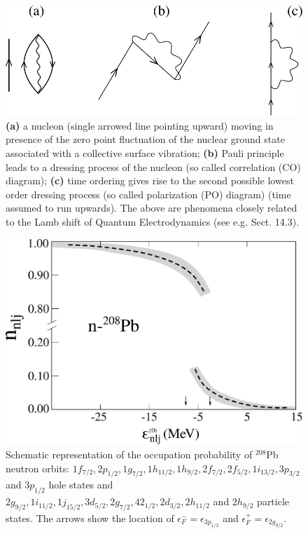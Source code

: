 \begin{figure}
	\centerline {
		\includegraphics*[width=12cm]{introduccion/figs/figpreface8}
	}
	\caption{\textbf{(a)} a nucleon (single arrowed line pointing upward) moving in presence of the zero point fluctuation of the nuclear ground state associated with a collective surface vibration; \textbf{(b)} Pauli principle leads to a dressing process of the nucleon (so called correlation (CO) diagram); \textbf{(c)} time ordering gives rise to the second possible lowest order dressing  process (so called polarization (PO) diagram) (time assumed to run upwards). The above are phenomena closely related to the Lamb shift of Quantum Electrodynamics (see e.g. \cite{Weinberg:96} Sect. 14.3).}
	\label{fig1.0.8}
\end{figure}
\begin{figure}
	\centerline {
		\includegraphics*[width=12cm]{introduccion/figs/fig1_2_5}
	}
	\caption{Schematic representation of the occupation probability of $^{208}$Pb neutron orbits: $1f_{7/2},2p_{1/2},1g_{7/2},1h_{11/2},1h_{9/2},2f_{7/2},2f_{5/2},1i_{13/2},3p_{3/2}$ and $3p_{1/2}$ hole states and $2g_{9/2},1i_{11/2},1j_{15/2},3d_{5/2},2g_{7/2},42_{1/2},2d_{3/2},2h_{11/2}$ and $2h_{9/2}$ particle states. The arrows show the location of $\epsilon^-_F=\epsilon_{3p_{1/2}}$ and $\epsilon^+_F=\epsilon_{2g_{9/2}}$.}
	\label{fig1.2.5}
\end{figure}
